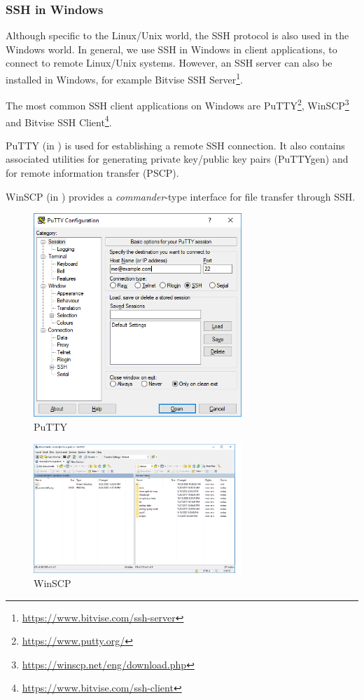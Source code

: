 \subsubsection{SSH in Windows}
\label{sec:sec:transfer:ssh:windows}

Although specific to the Linux/Unix world, the SSH protocol is also used in the Windows world.
In general, we use SSH in Windows in client applications, to connect to remote Linux/Unix systems.
However, an SSH server can also be installed in Windows, for example Bitvise SSH Server\footnote{\url{https://www.bitvise.com/ssh-server}}.

The most common SSH client applications on Windows are PuTTY\footnote{\url{https://www.putty.org/}}, WinSCP\footnote{\url{https://winscp.net/eng/download.php}} and Bitvise SSH Client\footnote{\url{https://www.bitvise.com/ssh-client}}.

PuTTY (in ) is used for establishing a remote SSH connection.
It also contains associated utilities for generating private key/public key pairs (PuTTYgen) and for remote information transfer (PSCP).

WinSCP (in ) provides a \textit{commander}-type interface for file transfer through SSH.

\begin{figure}[!htbp]
  \centering
  \includegraphics[width=0.7\textwidth]{chapters/12-auth/img/putty.png}
  \caption{PuTTY}
  \label{fig:sec:putty}
\end{figure}

\begin{figure}[!htbp]
  \centering
  \includegraphics[width=0.7\textwidth]{chapters/12-auth/img/winscp.png}
  \caption{WinSCP}
  \label{fig:sec:winscp}
\end{figure} 